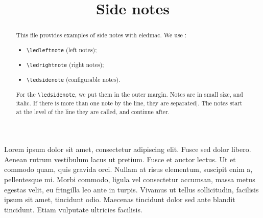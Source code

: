\documentclass{article}
\begin{document}
\begin{english}
\title{Side notes}
\maketitle
\begin{abstract}
This file provides examples of side notes with eledmac. 
We use :
\begin{itemize}
  \item \verb+\ledleftnote+ (left notes); 
  \item \verb+\ledrightnote+ (right notes); 
  \item \verb+\ledsidenote+ (configurable notes).
\end{itemize}

For the \verb+\ledsidenote+, we put them in the outer margin.
Notes are in small size, and italic. If there is more than one note by the line, they are separated$ | $. The notes start at the level of the line they are called, and continue after.
\end{abstract}
\end{english}

\beginnumbering
\pstart
Lorem ipsum dolor sit amet, consectetur adipiscing elit. Fusce sed dolor libero. Aenean rutrum vestibulum lacus ut pretium. Fusce et auctor lectus. Ut et commodo quam, quis gravida orci. Nullam at risus elementum, suscipit enim a, pellentesque mi. Morbi commodo, ligula vel consectetur accumsan, massa metus egestas velit, eu fringilla leo ante in turpis. Vivamus ut tellus sollicitudin, facilisis ipsum sit amet, tincidunt odio. Maecenas tincidunt dolor sed ante blandit tincidunt. Etiam vulputate ultricies facilisis.
\pend
\endnumbering
\end{document}
